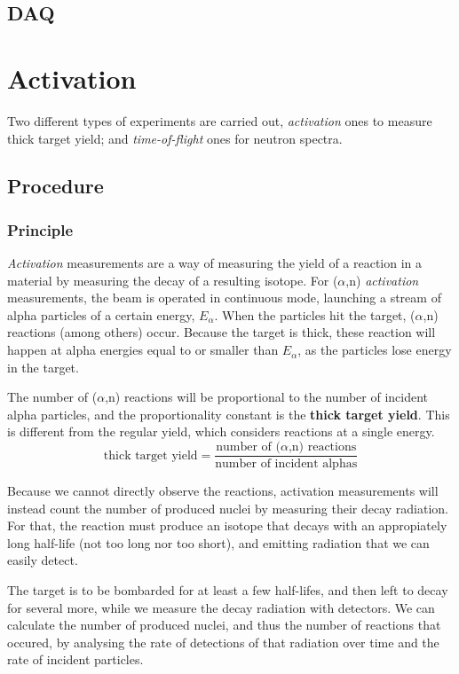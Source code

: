\documentclass[a4paper,12pt]{report}
\newcommand{\an}{($\alpha$,n) }
\begin{document}
\section{DAQ}


\chapter{Activation}
Two different types of experiments are carried out, \textit{activation} ones to measure thick target yield; and \textit{time-of-flight} ones for neutron spectra.

\section{Procedure}

\subsection{Principle}
\textit{Activation} measurements are a way of measuring the yield of a reaction in a material by measuring the decay of a resulting isotope.
For \an \textit{activation} measurements, the beam is operated in continuous mode, launching a stream of alpha particles of a certain energy, $E_\alpha$.
When the particles hit the target, \an reactions (among others) occur.
Because the target is thick, these reaction will happen at alpha energies equal to or smaller than $E_\alpha$, as the particles lose energy in the target.

The number of \an reactions will be proportional to the number of incident alpha particles, and the proportionality constant is the \textbf{thick target yield}.
This is different from the regular yield, which considers reactions at a single energy.
\begin{equation}
	\text{thick target yield} = \frac{\text{number of \an reactions}}{\text{number of incident alphas}}
\end{equation}

Because we cannot directly observe the reactions, activation measurements will instead count the number of produced nuclei by measuring their decay radiation.
For that, the reaction must produce an isotope that decays with an appropiately long half-life (not too long nor too short), and emitting radiation that we can easily detect.

The target is to be bombarded for at least a few half-lifes, and then left to decay for several more, while we measure the decay radiation with detectors.
We can calculate the number of produced nuclei, and thus the number of reactions that occured, by analysing the rate of detections of that radiation over time and the rate of incident particles.
\end{document}
